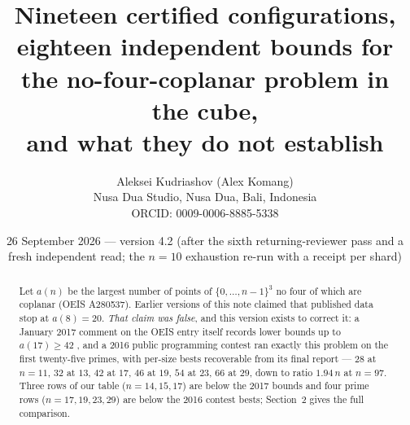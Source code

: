 \documentclass[11pt,a4paper]{article}
\title{Nineteen certified configurations, eighteen independent bounds for the no-four-coplanar problem in the cube,\\
and what they do not establish}
\author{Aleksei Kudriashov (Alex Komang)\\ \small Nusa Dua Studio, Nusa Dua, Bali, Indonesia\\ \small ORCID: 0009-0006-8885-5338}
\date{26 September 2026 --- version 4.2 (after the sixth returning-reviewer pass and a fresh independent read; the $n=10$ exhaustion re-run with a receipt per shard)}
\begin{document}
\maketitle
\begin{abstract}
Let $a(n)$ be the largest number of points of $\{0,\dots,n-1\}^3$ no four of which are coplanar
(OEIS A280537).  Earlier versions of this note claimed that published data stop at $a(8)=20$.
\emph{That claim was false}, and this version exists to correct it: a January 2017 comment on
the OEIS entry itself records lower bounds up to $a(17)\ge42$ \cite{OEISA280537}, and a 2016
public programming contest ran exactly this problem on the first twenty-five primes, with
per-size bests recoverable from its final report \cite{AZsPCs} --- $28$ at $n=11$, $32$ at $13$,
$42$ at $17$, $46$ at $19$, $54$ at $23$, $66$ at $29$, down to ratio $1.94\,n$ at $n=97$.
Three rows of our table ($n=14,15,17$) are below the 2017 bounds and four prime rows
($n=17,19,23,29$) are below the 2016 contest bests; Section~2 gives the full comparison.


\end{abstract}
\end{document}
